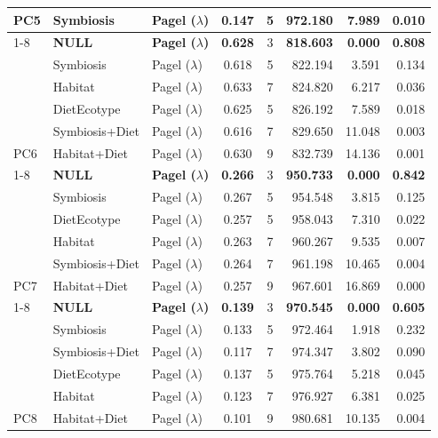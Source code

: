 \begin{table}[!h]
\begin{tabular}[t]{lllccrrr}
\multirow{-6}{*}{\raggedright\arraybackslash PC5} & Symbiosis & Pagel ($\lambda$) & 0.147 & 5 & 972.180 & 7.989 & 0.010\\
\cmidrule{1-8}
 & \textbf{NULL} & \textbf{Pagel ($\lambda$)} & \textbf{0.628} & 3 & \textbf{818.603} & \textbf{0.000} & \textbf{0.808}\\

 & Symbiosis & Pagel ($\lambda$) & 0.618 & 5 & 822.194 & 3.591 & 0.134\\

 & Habitat & Pagel ($\lambda$) & 0.633 & 7 & 824.820 & 6.217 & 0.036\\

 & DietEcotype & Pagel ($\lambda$) & 0.625 & 5 & 826.192 & 7.589 & 0.018\\

 & Symbiosis+Diet & Pagel ($\lambda$) & 0.616 & 7 & 829.650 & 11.048 & 0.003\\

\multirow{-6}{*}{\raggedright\arraybackslash PC6} & Habitat+Diet & Pagel ($\lambda$) & 0.630 & 9 & 832.739 & 14.136 & 0.001\\
\cmidrule{1-8}
 & \textbf{NULL} & \textbf{Pagel ($\lambda$)} & \textbf{0.266} & 3 & \textbf{950.733} & \textbf{0.000} & \textbf{0.842}\\

 & Symbiosis & Pagel ($\lambda$) & 0.267 & 5 & 954.548 & 3.815 & 0.125\\

 & DietEcotype & Pagel ($\lambda$) & 0.257 & 5 & 958.043 & 7.310 & 0.022\\

 & Habitat & Pagel ($\lambda$) & 0.263 & 7 & 960.267 & 9.535 & 0.007\\

 & Symbiosis+Diet & Pagel ($\lambda$) & 0.264 & 7 & 961.198 & 10.465 & 0.004\\

\multirow{-6}{*}{\raggedright\arraybackslash PC7} & Habitat+Diet & Pagel ($\lambda$) & 0.257 & 9 & 967.601 & 16.869 & 0.000\\
\cmidrule{1-8}
 & \textbf{NULL} & \textbf{Pagel ($\lambda$)} & \textbf{0.139} & 3 & \textbf{970.545} & \textbf{0.000} & \textbf{0.605}\\

 & Symbiosis & Pagel ($\lambda$) & 0.133 & 5 & 972.464 & 1.918 & 0.232\\

 & Symbiosis+Diet & Pagel ($\lambda$) & 0.117 & 7 & 974.347 & 3.802 & 0.090\\

 & DietEcotype & Pagel ($\lambda$) & 0.137 & 5 & 975.764 & 5.218 & 0.045\\

 & Habitat & Pagel ($\lambda$) & 0.123 & 7 & 976.927 & 6.381 & 0.025\\

\multirow{-6}{*}{\raggedright\arraybackslash PC8} & Habitat+Diet & Pagel ($\lambda$) & 0.101 & 9 & 980.681 & 10.135 & 0.004\\
\bottomrule
\end{tabular}
\end{table}
